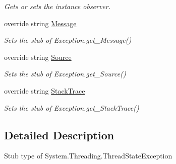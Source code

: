 \begin{DoxyCompactItemize}
\begin{DoxyCompactList}\small\item\em Gets or sets the instance observer.\end{DoxyCompactList}\item 
override string \hyperlink{class_system_1_1_threading_1_1_fakes_1_1_stub_thread_state_exception_a6b0d8fe0dac6adc5e46cff71989791d0}{Message}
\begin{DoxyCompactList}\small\item\em Sets the stub of Exception.\-get\-\_\-\-Message()\end{DoxyCompactList}\item 
override string \hyperlink{class_system_1_1_threading_1_1_fakes_1_1_stub_thread_state_exception_a54013b74412bd619f2540b4bba75f523}{Source}
\begin{DoxyCompactList}\small\item\em Sets the stub of Exception.\-get\-\_\-\-Source()\end{DoxyCompactList}\item 
override string \hyperlink{class_system_1_1_threading_1_1_fakes_1_1_stub_thread_state_exception_a75381e2064a6fe712748ccaec2330e2e}{Stack\-Trace}
\begin{DoxyCompactList}\small\item\em Sets the stub of Exception.\-get\-\_\-\-Stack\-Trace()\end{DoxyCompactList}\end{DoxyCompactItemize}


\subsection{Detailed Description}
Stub type of System.\-Threading.\-Thread\-State\-Exception



